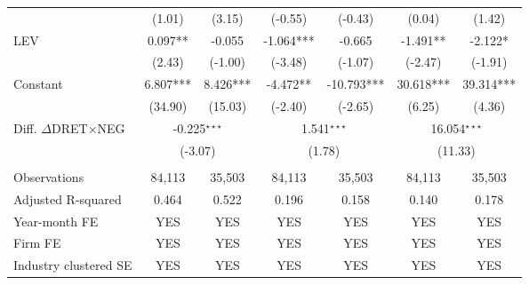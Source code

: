 \begin{table}[htbp]
\begin{tabular}{lcccccc}
      & (1.01) & \multicolumn{1}{c}{(3.15)} & (-0.55) & \multicolumn{1}{c}{(-0.43)} & (0.04) & \multicolumn{1}{c}{(1.42)} \\
    LEV & 0.097** & \multicolumn{1}{c}{-0.055} & -1.064*** & \multicolumn{1}{c}{-0.665} & -1.491** & \multicolumn{1}{c}{-2.122*} \\
      & (2.43) & \multicolumn{1}{c}{(-1.00)} & (-3.48) & \multicolumn{1}{c}{(-1.07)} & (-2.47) & \multicolumn{1}{c}{(-1.91)} \\
    Constant & 6.807*** & \multicolumn{1}{c}{8.426***} & -4.472** & \multicolumn{1}{c}{-10.793***} & 30.618*** & \multicolumn{1}{c}{39.314***} \\
      & (34.90) & \multicolumn{1}{c}{(15.03)} & (-2.40) & \multicolumn{1}{c}{(-2.65)} & (6.25) & \multicolumn{1}{c}{(4.36)} \\
    \rowcolor[rgb]{ .933,  .925,  .882} Diff. $\Delta$DRET$\times$NEG & \multicolumn{2}{c}{ -0.225$^{\star\star\star}$} & \multicolumn{2}{c}{1.541$^{\star\star\star}$} & \multicolumn{2}{c}{16.054$^{\star\star\star}$} \\
    \rowcolor[rgb]{ .933,  .925,  .882} & \multicolumn{2}{c}{(-3.07)} & \multicolumn{2}{c}{ (1.78)} & \multicolumn{2}{c}{(11.33)} \\
    &&&&&&\\
    Observations & 84,113 & \multicolumn{1}{c}{35,503} & 84,113 & \multicolumn{1}{c}{35,503} & 84,113 & \multicolumn{1}{c}{35,503} \\
    Adjusted R-squared & 0.464 & \multicolumn{1}{c}{0.522} & 0.196 & \multicolumn{1}{c}{0.158} & 0.140 & \multicolumn{1}{c}{0.178} \\
    Year-month FE & YES & \multicolumn{1}{c}{YES} & YES & \multicolumn{1}{c}{YES} & YES & \multicolumn{1}{c}{YES} \\
    Firm FE & YES & \multicolumn{1}{c}{YES} & YES & \multicolumn{1}{c}{YES} & YES & \multicolumn{1}{c}{YES} \\
    Industry clustered SE & YES & \multicolumn{1}{c}{YES} & YES & \multicolumn{1}{c}{YES} & YES & \multicolumn{1}{c}{YES} \\
    \bottomrule
    \bottomrule
    \end{tabular}%
\end{table}%

